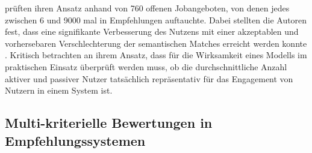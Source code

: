 \textcite[S. 15f.]{rodriguez:inproceedings} prüften ihren Ansatz anhand von 760 offenen Jobangeboten, von denen jedes zwischen 6 und 9000 mal in Empfehlungen auftauchte.
Dabei stellten die Autoren fest, dass eine signifikante Verbesserung des Nutzens mit einer akzeptablen und vorhersebaren Verschlechterung der semantischen Matches erreicht werden konnte \cite[S. 11]{rodriguez:inproceedings}.
Kritisch betrachten \textcite[S. 16]{rodriguez:inproceedings} an ihrem Ansatz, dass für die Wirksamkeit eines Modells im praktischen Einsatz überprüft werden muss, ob die durchschnittliche Anzahl aktiver und passiver Nutzer tatsächlich repräsentativ für das Engagement von Nutzern in einem System ist.

\subsection{Multi-kriterielle Bewertungen in Empfehlungssystemen}

